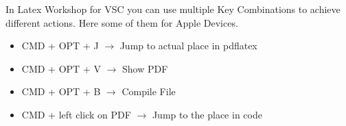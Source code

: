 %
%

\begin{tcolorbox}[tutorial,title={Hinweis}]
In Latex Workshop for VSC you can use multiple Key Combinations to achieve different actions. Here some of them for Apple Devices.
\end{tcolorbox}

\begin{itemize}
    \item CMD + OPT + J $\rightarrow$ Jump to actual place in pdflatex
    \item CMD + OPT + V $\rightarrow$ Show PDF
    \item CMD + OPT + B $\rightarrow$ Compile File
    \item CMD + left click on PDF $\rightarrow$ Jump to the place in code
\end{itemize}
